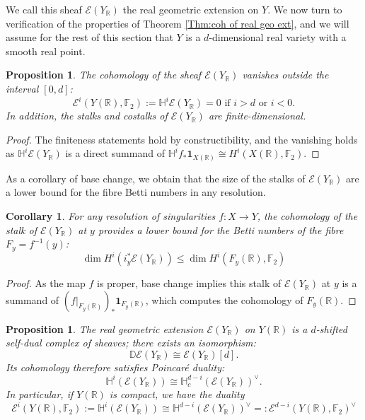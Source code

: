 \documentclass{amsart}
\newtheorem{prop}[thm]{Proposition}
\newtheorem{cor}[thm]{Corollary}
\theoremstyle{definition}
\theoremstyle{remark}
\begin{document}
We call this sheaf $\mathscr{E}(Y_\mathbb{R})$ the real geometric extension on $Y$.
We now turn to verification of the properties of Theorem \ref{Thm:coh of real geo ext}, and we will assume for the rest of this section that $Y$ is a $d$-dimensional real variety with a smooth real point.

\begin{prop}
The cohomology of the sheaf $\mathscr{E}(Y_\mathbb{R})$ vanishes outside the interval $[0,d]$:
\[\mathscr{E}^i(Y(\mathbb{R}),\mathbb{F}_2):=\mathbb{H}^i\mathscr{E}(Y_\mathbb{R})=0 \text{ if } i>d \text{ or } i<0.\]
In addition, the stalks and costalks of $\mathscr{E}(Y_\mathbb{R})$ are finite-dimensional.
\end{prop}

\begin{proof}
The finiteness statements hold by constructibility, and the vanishing holds as $\mathbb{H}^i\mathscr{E}(Y_\mathbb{R})$ is a direct summand of $\mathbb{H}^if_*\mathbf{1}_{X(\mathbb{R})}\cong H^i(X(\mathbb{R}),\mathbb{F}_2)$.
\end{proof}

As a corollary of base change, we obtain that the size of the stalks of $\mathscr{E}(Y_\mathbb{R})$ are a lower bound for the fibre Betti numbers in any resolution.

\begin{cor}
For any resolution of singularities $f:X\to Y$, the cohomology of the stalk of $\mathscr{E}(Y_\mathbb{R})$ at $y$ provides a lower bound for the Betti numbers of the fibre $F_y=f^{-1}(y)$:
    \[\dim H^i(i_y^* \mathscr{E}(Y_\mathbb{R}))\leq \dim H^i(F_y(\mathbb{R}),\mathbb{F}_2)\]
\end{cor}

\begin{proof}
As the map $f$ is proper, base change implies this stalk of $\mathscr{E}(Y_\mathbb{R})$ at $y$ is a summand of $(f|_{F_y(\mathbb{R})})_*\mathbf{1}_{F_y(\mathbb{R})}$, which computes the cohomology of $F_y(\mathbb{R})$.
\end{proof}


\begin{prop}\label{propertiesrealgeoext}
The real geometric extension $\mathscr{E}(Y_\mathbb{R})$ on $Y(\mathbb{R})$ is a $d$-shifted self-dual complex of sheaves; there exists an isomorphism: \[\mathbb{D}\mathscr{E}(Y_\mathbb{R})\cong \mathscr{E}(Y_\mathbb{R})[d].\]
Its cohomology therefore satisfies Poincaré duality:    
\[\mathbb{H}^i(\mathscr{E}(Y_\mathbb{R}))\cong \mathbb{H}^{d-i}_c(\mathscr{E}(Y_\mathbb{R}))^\vee.\]
In particular, if $Y(\mathbb{R})$ is compact, we have the duality \[\mathscr{E}^i(Y(\mathbb{R}),\mathbb{F}_2):=\mathbb{H}^i(\mathscr{E}(Y_\mathbb{R}))\cong \mathbb{H}^{d-i}(\mathscr{E}(Y_\mathbb{R}))^\vee=:\mathscr{E}^{d-i}(Y(\mathbb{R}),\mathbb{F}_2)^\vee\]
\end{prop}
\end{document}

